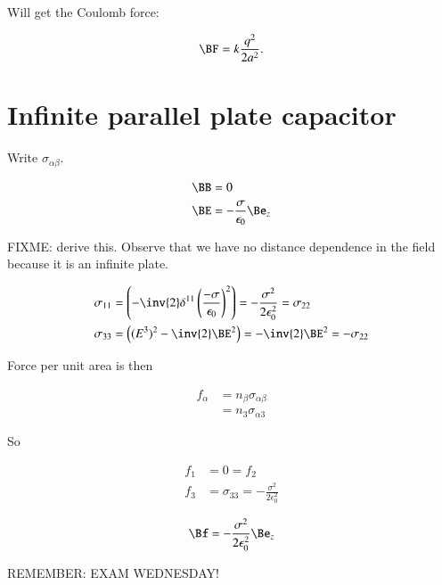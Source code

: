 Will get the Coulomb force:

\begin{equation}\label{eqn:relativisticElectrodynamicsT9:330}
\BF = k \frac{q^2}{2 a^2}.
\end{equation}

\section{Infinite parallel plate capacitor}

Write $\sigma_{\alpha\beta}$.

\begin{align}\label{eqn:relativisticElectrodynamicsT9:350}
\BB &= 0  \\
\BE &= - \frac{\sigma}{\epsilon_0} \Be_z
\end{align}

FIXME: derive this.  Observe that we have no distance dependence in the field because it is an infinite plate.

\begin{align}\label{eqn:relativisticElectrodynamicsT9:370}
\sigma_{1 1} &= \left( - \inv{2} \delta^{1 1} \left( \frac{-\sigma}{\epsilon_0} \right)^2 \right) = - \frac{ \sigma^2}{ 2 \epsilon_0^2 } = \sigma_{22} \\
\sigma_{3 3} &= \left( (E^3)^2 - \inv{2} \BE^2 \right)  = - \inv{2} \BE^2 = - \sigma_{2 2}
\end{align}

Force per unit area is then

\begin{align*}
f_\alpha 
&= n_\beta \sigma_{\alpha \beta} \\
&= n_3 \sigma_{\alpha 3}
\end{align*}

So 

\begin{align}\label{eqn:relativisticElectrodynamicsT9:390}
f_1 &= 0 = f_2 \\
f_3 &= \sigma_{3 3} = -\frac{\sigma^2}{2 \epsilon_0^2}
\end{align}

\begin{equation}\label{eqn:relativisticElectrodynamicsT9:410}
\Bf = -\frac{\sigma^2}{2 \epsilon_0^2} \Be_z
\end{equation}

REMEMBER: EXAM WEDNESDAY!

\EndArticle
